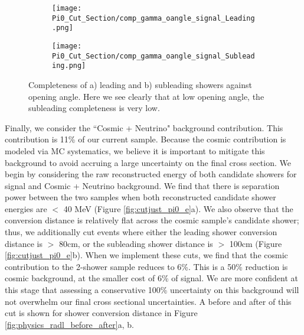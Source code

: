 \begin{figure}[H]
\centering
  \begin{subfigure}[t]{0.35\textwidth}
    \centering
\texttt{[image: Pi0\_Cut\_Section/comp\_gamma\_oangle\_signal\_Leading.png]}
  \caption{ }
  \end{subfigure} 
  \hspace{20mm}
  \begin{subfigure}[t]{0.35\textwidth}
    \centering
    \texttt{[image: Pi0\_Cut\_Section/comp\_gamma\_oangle\_signal\_Subleading.png]}
  \caption{ }
  \end{subfigure} 
\caption{ Completeness of a) leading and b) subleading showers against opening angle. Here we see clearly that at low opening angle, the subleading completeness is very low. }
\label{fig:comp_cutjust_pi0_OA}
\end{figure}



Finally, we consider the ``Cosmic + Neutrino" background contribution. This contribution is 11\% of our current sample. Because the cosmic contribution is modeled via MC systematics, we believe it is important to mitigate this background to avoid accruing a large uncertainty on the final cross section.  We begin by considering the raw reconstructed energy of both candidate showers for signal and Cosmic + Neutrino background. We find that there is separation power between the two samples when both reconstructed candidate shower energies are $<$ 40 MeV (Figure \ref{fig:cutjust_pi0_e}a).  We also observe that the conversion distance is relatively flat across the cosmic sample's candidate shower; thus, we additionally cut events where either the leading shower conversion distance is $>$ 80cm, or the subleading shower distance is $>$ 100cm (Figure \ref{fig:cutjust_pi0_e}b). When we implement these cuts, we find that the cosmic contribution to the 2-shower sample reduces to 6\%. This is a 50\% reduction is cosmic background, at the smaller cost of 6\% of signal. We are more confident at this stage that assessing a conservative 100\% uncertainty on this background will not overwhelm our final cross sectional uncertainties. A before and after of this cut is shown for shower conversion distance in Figure \ref{fig:physics_radl_before_after}a, b.
 

